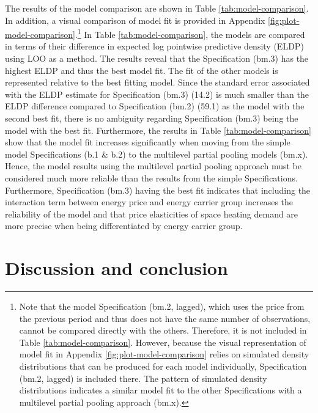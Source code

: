 \documentclass[12pt,twoside]{reedthesis}
\begin{document}
The results of the model comparison are shown in Table \ref{tab:model-comparison}. In addition, a visual comparison of model fit is provided in Appendix \ref{fig:plot-model-comparison}.\footnote{Note that the model Specification (bm.2, lagged), which uses the price from the previous period and thus does not have the same number of observations, cannot be compared directly with the others. Therefore, it is not included in Table \ref{tab:model-comparison}. However, because the visual representation of model fit in Appendix \ref{fig:plot-model-comparison} relies on simulated density distributions that can be produced for each model individually, Specification (bm.2, lagged) is included there. The pattern of simulated density distributions indicates a similar model fit to the other Specifications with a multilevel partial pooling approach (bm.x).} In Table \ref{tab:model-comparison}, the models are compared in terms of their difference in expected log pointwise predictive density (ELDP) using LOO as a method. The results reveal that the Specification (bm.3) has the highest ELDP and thus the best model fit. The fit of the other models is represented relative to the best fitting model. Since the standard error associated with the ELDP estimate for Specification (bm.3) (14.2) is much smaller than the ELDP difference compared to Specification (bm.2) (59.1) as the model with the second best fit, there is no ambiguity regarding Specification (bm.3) being the model with the best fit. Furthermore, the results in Table \ref{tab:model-comparison} show that the model fit increases significantly when moving from the simple model Specifications (b.1 \& b.2) to the multilevel partial pooling models (bm.x). Hence, the model results using the multilevel partial pooling approach must be considered much more reliable than the results from the simple Specifications. Furthermore, Specification (bm.3) having the best fit indicates that including the interaction term between energy price and energy carrier group increases the reliability of the model and that price elasticities of space heating demand are more precise when being differentiated by energy carrier group.

\hypertarget{discussion}{%
\chapter{Discussion and conclusion}\label{discussion}}
\end{document}
